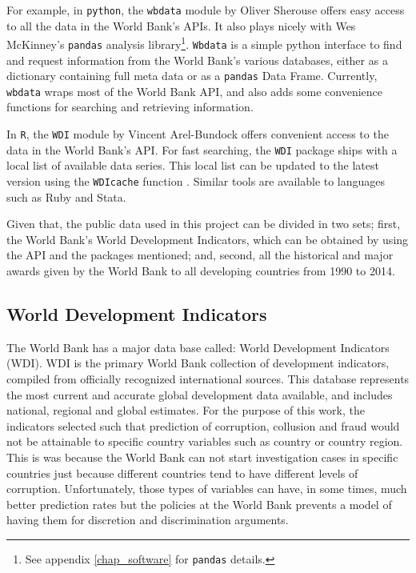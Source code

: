 For example, in \texttt{python}, the \texttt{wbdata} module by Oliver Sherouse offers easy access to all the data in the World Bank's APIs. It also plays nicely with Wes McKinney’s  \texttt{pandas} analysis library\footnote{See appendix \ref{chap_software} for \texttt{pandas} details.}. \texttt{Wbdata} is a simple python interface to find and request information from the World Bank's various databases, either as a dictionary containing full meta data or as a \texttt{pandas} Data Frame. Currently, \texttt{wbdata} wraps most of the World Bank API, and also adds some convenience functions for searching and retrieving information.

In \texttt{R}, the \texttt{WDI} module by Vincent Arel-Bundock offers convenient access to the data in the World Bank's API. For fast searching, the \texttt{WDI} package ships with a local list of available data series. This local list can be updated to the latest version using the \texttt{WDIcache} function \parencite{wb_r}. Similar tools are available to languages such as Ruby and Stata.

Given that, the public data used in this project can be divided in two sets; first, the World Bank's World Development Indicators, which can be obtained by using the API and the packages mentioned; and, second, all the historical and major awards given by the World Bank to all developing countries from 1990 to 2014. 


\subsection{World Development Indicators}

The World Bank has a major data base called: World Development Indicators (WDI). WDI is the primary World Bank collection of development indicators, compiled from officially recognized international sources. This database represents the most current and accurate global development data available, and includes national, regional and global estimates. For the purpose of this work, the indicators selected such that prediction of corruption, collusion and fraud would not be attainable to specific country variables such as country or country region. This is was because the World Bank can not start investigation cases in specific countries just because different countries tend to have different levels of corruption. Unfortunately, those types of variables can have, in some times, much better prediction rates but the policies at the World Bank prevents a model of having them for discretion and discrimination arguments.


